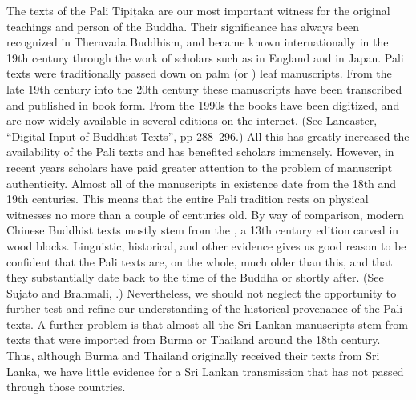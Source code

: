 {}\markdownRendererInterblockSeparator
{}The texts of the Pali Tipiṭaka are our most important witness for the original teachings and person of the Buddha. Their significance has always been recognized in Theravada Buddhism, and became known internationally in the 19th century through the work of scholars such as  in England and  in Japan.\markdownRendererInterblockSeparator
{}Pali texts were traditionally passed down on palm (or ) leaf manuscripts. From the late 19th century into the 20th century these manuscripts have been transcribed and published in book form. From the 1990s the books have been digitized, and are now widely available in several editions on the internet. (See Lancaster, “Digital Input of Buddhist Texts”, pp 288–296.) All this has greatly increased the availability of the Pali texts and has benefited scholars immensely.\markdownRendererInterblockSeparator
{}However, in recent years scholars have paid greater attention to the problem of manuscript authenticity. Almost all of the manuscripts in existence date from the 18th and 19th centuries. This means that the entire Pali tradition rests on physical witnesses no more than a couple of centuries old.\markdownRendererInterblockSeparator
{}By way of comparison, modern Chinese Buddhist texts mostly stem from the , a 13th century edition carved in wood blocks.\markdownRendererInterblockSeparator
{}Linguistic, historical, and other evidence gives us good reason to be confident that the Pali texts are, on the whole, much older than this, and that they substantially date back to the time of the Buddha or shortly after. (See Sujato and Brahmali, .) Nevertheless, we should not neglect the opportunity to further test and refine our understanding of the historical provenance of the Pali texts.\markdownRendererInterblockSeparator
{}A further problem is that almost all the Sri Lankan manuscripts stem from texts that were imported from Burma or Thailand around the 18th century. Thus, although Burma and Thailand originally received their texts from Sri Lanka, we have little evidence for a Sri Lankan transmission that has not passed through those countries.\markdownRendererInterblockSeparator
